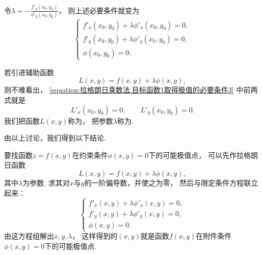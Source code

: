 令\(\lambda=-\frac{f'_y(x_0,y_0)}{\phi'_y(x_0,y_0)}\)，
则上述必要条件就变为
\begin{equation}\label{equation:拉格朗日乘数法.目标函数1取得极值的必要条件3}
	\left\{ \begin{array}{l}
		f'_x(x_0,y_0) + \lambda \phi'_x(x_0,y_0) = 0, \\
		f'_y(x_0,y_0) + \lambda \phi'_y(x_0,y_0) = 0, \\
		\phi(x_0,y_0) = 0.
	\end{array} \right.
\end{equation}

若引进辅助函数\begin{equation*}
	L(x,y) = f(x,y) + \lambda \phi(x,y),
\end{equation*}
则不难看出，
\cref{equation:拉格朗日乘数法.目标函数1取得极值的必要条件3} 中前两式就是\begin{equation*}
	L'_x(x_0,y_0)=0, \qquad
	L'_y(x_0,y_0)=0.
\end{equation*}
我们把函数\(L(x,y)\)称为，
把参数\(\lambda\)称为.

由以上讨论，我们得到以下结论.

要找函数\(z=f(x,y)\)在约束条件\(\phi(x,y)=0\)下的可能极值点，
可以先作拉格朗日函数\begin{equation*}
	L(x,y) = f(x,y) + \lambda \phi(x,y),
\end{equation*}
其中\(\lambda\)为参数.
求其对\(x\)与\(y\)的一阶偏导数，并使之为零，
然后与限定条件方程联立起来：\begin{equation*}
	\left\{ \begin{array}{l}
		f'_x(x,y)+\lambda\phi'_x(x,y)=0, \\
		f'_y(x,y)+\lambda\phi'_y(x,y)=0, \\
		\phi(x,y)=0.
	\end{array} \right.
\end{equation*}
由这方程组解出\(x,y,\lambda\)，
这样得到的\((x,y)\)就是函数\(f(x,y)\)在附件条件\(\phi(x,y)=0\)下的可能极值点.

